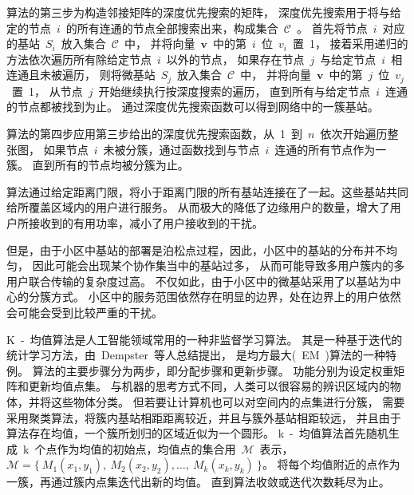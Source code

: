 算法的第三步为构造邻接矩阵的深度优先搜索的矩阵，
深度优先搜索用于将与给定的节点~$i$~的所有连通的节点全部搜索出来，构成集合~$\mathcal{C}$~。
首先将节点~$i$~对应的基站~$S_i$~放入集合~$\mathcal{C}$~中，
并将向量~$\mathbf{v}$~中的第~$i$~位~$v_i$~置~1，
接着采用递归的方法依次遍历所有除给定节点~$i$~以外的节点，
如果存在节点~$j$~与给定节点~$i$~相连通且未被遍历，
则将微基站~$S_j$~放入集合~$\mathcal{C}$~中，
并将向量~$\mathbf{v}$~中的第~$j$~位~$v_j$~置~1，
从节点~$j$~开始继续执行按深度搜索的遍历，
直到所有与给定节点~$i$~连通的节点都被找到为止。
通过深度优先搜索函数可以得到网络中的一簇基站。

算法的第四步应用第三步给出的深度优先搜索函数，从~1~到~$n$~依次开始遍历整张图，
如果节点~$i$~未被分簇，通过函数找到与节点~$i$~连通的所有节点作为一簇。
直到所有的节点均被分簇为止。


算法通过给定距离门限，将小于距离门限的所有基站连接在了一起。这些基站共同给所覆盖区域内的用户进行服务。
从而极大的降低了边缘用户的数量，增大了用户所接收到的有用功率，减小了用户接收到的干扰。

但是，由于小区中基站的部署是泊松点过程，因此，小区中的基站的分布并不均匀，
因此可能会出现某个协作集当中的基站过多，
从而可能导致多用户簇内的多用户联合传输的复杂度过高。
不仅如此，由于小区中的微基站采用了以基站为中心的分簇方式。
小区中的服务范围依然存在明显的边界，处在边界上的用户依然会可能会受到比较严重的干扰。


K~-~均值算法是人工智能领域常用的一种非监督学习算法。
其是一种基于迭代的统计学习方法，由~Dempster~等人总结提出，
是均方最大(~EM~)算法的一种特例。
算法的主要步骤分为两步，即分配步骤和更新步骤。
功能分别为设定权重矩阵和更新均值点集。
与机器的思考方式不同，人类可以很容易的辨识区域内的物体，并将这些物体分类。
但若要让计算机也可以对空间内的点集进行分簇，
需要采用聚类算法，将簇内基站相距距离较近，并且与簇外基站相距较远，
并且由于算法存在均值，一个簇所划归的区域近似为一个圆形。
k~-~均值算法首先随机生成~k~个点作为均值的初始点，均值点的集合用~$\mathcal{M}$~表示，
$\mathcal{M}=\{~M_1(x_1,y_1),~M_2(x_2,y_2),\dots,~M_k(x_k,y_k)~\}$。
将每个均值附近的点作为一簇，再通过簇内点集迭代出新的均值。
直到算法收敛或迭代次数耗尽为止。

